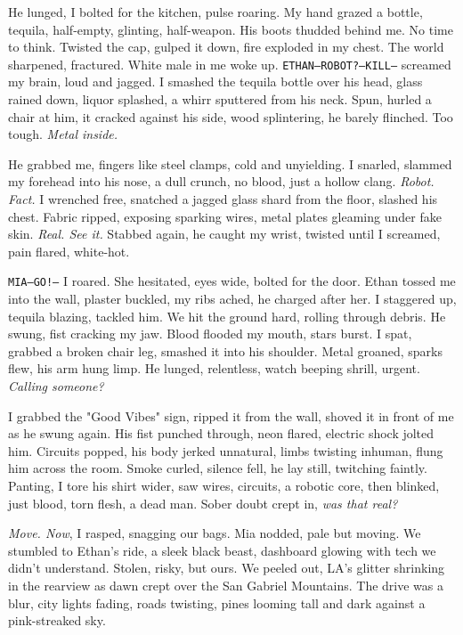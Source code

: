 \documentclass[12pt,oneside]{book}
\newcommand{\note}[1]{\texttt{#1}}
\begin{document}
He lunged, I bolted for the kitchen, pulse roaring. My hand grazed a bottle, tequila, half-empty, glinting, half-weapon. His boots thudded behind me. No time to think. Twisted the cap, gulped it down, fire exploded in my chest. The world sharpened, fractured. White male in me woke up. \note{ETHAN—ROBOT?—KILL—} screamed my brain, loud and jagged. I smashed the tequila bottle over his head, glass rained down, liquor splashed, a whirr sputtered from his neck. Spun, hurled a chair at him, it cracked against his side, wood splintering, he barely flinched. Too tough. \textit{Metal inside.}

He grabbed me, fingers like steel clamps, cold and unyielding. I snarled, slammed my forehead into his nose, a dull crunch, no blood, just a hollow clang. \textit{Robot. Fact.} I wrenched free, snatched a jagged glass shard from the floor, slashed his chest. Fabric ripped, exposing sparking wires, metal plates gleaming under fake skin. \textit{Real. See it.} Stabbed again, he caught my wrist, twisted until I screamed, pain flared, white-hot.

\note{MIA—GO!—} I roared. She hesitated, eyes wide, bolted for the door. Ethan tossed me into the wall, plaster buckled, my ribs ached, he charged after her. I staggered up, tequila blazing, tackled him. We hit the ground hard, rolling through debris. He swung, fist cracking my jaw. Blood flooded my mouth, stars burst. I spat, grabbed a broken chair leg, smashed it into his shoulder. Metal groaned, sparks flew, his arm hung limp. He lunged, relentless, watch beeping shrill, urgent. \textit{Calling someone?}

I grabbed the "Good Vibes" sign, ripped it from the wall, shoved it in front of me as he swung again. His fist punched through, neon flared, electric shock jolted him. Circuits popped, his body jerked unnatural, limbs twisting inhuman, flung him across the room. Smoke curled, silence fell, he lay still, twitching faintly. Panting, I tore his shirt wider, saw wires, circuits, a robotic core, then blinked, just blood, torn flesh, a dead man. Sober doubt crept in, \textit{was that real?}

\textit{Move. Now}, I rasped, snagging our bags. Mia nodded, pale but moving. We stumbled to Ethan’s ride, a sleek black beast, dashboard glowing with tech we didn’t understand. Stolen, risky, but ours. We peeled out, LA’s glitter shrinking in the rearview as dawn crept over the San Gabriel Mountains. The drive was a blur, city lights fading, roads twisting, pines looming tall and dark against a pink-streaked sky.
\end{document}
